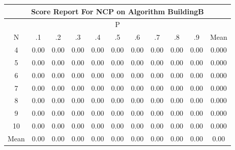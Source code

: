 \documentclass[11pt,a4paper]{report}
\begin{document}
\begin{longtable}{ | c || c | c | c | c | c | c | c | c | c || c |}
\hline
\multicolumn{11}{|c|}{ Score Report For NCP on Algorithm BuildingB} \\
\hline
\multicolumn{11}{|c|}{ P } \\
\hline
N & .1 & .2 & .3 & .4 & .5 & .6 & .7 & .8 & .9 & Mean\\
 \hline
 \hline
 \endhead
  4 &  \cellcolor[HTML]{FFFFFF} 0.00 &  \cellcolor[HTML]{FFFFFF} 0.00 &  \cellcolor[HTML]{FFFFFF} 0.00 &  \cellcolor[HTML]{FFFFFF} 0.00 &  \cellcolor[HTML]{FFFFFF} 0.00 &  \cellcolor[HTML]{FFFFFF} 0.00 &  \cellcolor[HTML]{FFFFFF} 0.00 &  \cellcolor[HTML]{FFFFFF} 0.00 &  \cellcolor[HTML]{FFFFFF} 0.00 & 0.000 \\
  5 &  \cellcolor[HTML]{FFFFFF} 0.00 &  \cellcolor[HTML]{FFFFFF} 0.00 &  \cellcolor[HTML]{FFFFFF} 0.00 &  \cellcolor[HTML]{FFFFFF} 0.00 &  \cellcolor[HTML]{FFFFFF} 0.00 &  \cellcolor[HTML]{FFFFFF} 0.00 &  \cellcolor[HTML]{FFFFFF} 0.00 &  \cellcolor[HTML]{FFFFFF} 0.00 &  \cellcolor[HTML]{FFFFFF} 0.00 & 0.000 \\
  6 &  \cellcolor[HTML]{FFFFFF} 0.00 &  \cellcolor[HTML]{FFFFFF} 0.00 &  \cellcolor[HTML]{FFFFFF} 0.00 &  \cellcolor[HTML]{FFFFFF} 0.00 &  \cellcolor[HTML]{FFFFFF} 0.00 &  \cellcolor[HTML]{FFFFFF} 0.00 &  \cellcolor[HTML]{FFFFFF} 0.00 &  \cellcolor[HTML]{FFFFFF} 0.00 &  \cellcolor[HTML]{FFFFFF} 0.00 & 0.000 \\
  7 &  \cellcolor[HTML]{FFFFFF} 0.00 &  \cellcolor[HTML]{FFFFFF} 0.00 &  \cellcolor[HTML]{FFFFFF} 0.00 &  \cellcolor[HTML]{FFFFFF} 0.00 &  \cellcolor[HTML]{FFFFFF} 0.00 &  \cellcolor[HTML]{FFFFFF} 0.00 &  \cellcolor[HTML]{FFFFFF} 0.00 &  \cellcolor[HTML]{FFFFFF} 0.00 &  \cellcolor[HTML]{FFFFFF} 0.00 & 0.000 \\
  8 &  \cellcolor[HTML]{FFFFFF} 0.00 &  \cellcolor[HTML]{FFFFFF} 0.00 &  \cellcolor[HTML]{FFFFFF} 0.00 &  \cellcolor[HTML]{FFFFFF} 0.00 &  \cellcolor[HTML]{FFFFFF} 0.00 &  \cellcolor[HTML]{FFFFFF} 0.00 &  \cellcolor[HTML]{FFFFFF} 0.00 &  \cellcolor[HTML]{FFFFFF} 0.00 &  \cellcolor[HTML]{FFFFFF} 0.00 & 0.000 \\
  9 &  \cellcolor[HTML]{FFFFFF} 0.00 &  \cellcolor[HTML]{FFFFFF} 0.00 &  \cellcolor[HTML]{FFFFFF} 0.00 &  \cellcolor[HTML]{FFFFFF} 0.00 &  \cellcolor[HTML]{FFFFFF} 0.00 &  \cellcolor[HTML]{FFFFFF} 0.00 &  \cellcolor[HTML]{FFFFFF} 0.00 &  \cellcolor[HTML]{FFFFFF} 0.00 &  \cellcolor[HTML]{FFFFFF} 0.00 & 0.000 \\
  10 &  \cellcolor[HTML]{FFFFFF} 0.00 &  \cellcolor[HTML]{FFFFFF} 0.00 &  \cellcolor[HTML]{FFFFFF} 0.00 &  \cellcolor[HTML]{FFFFFF} 0.00 &  \cellcolor[HTML]{FFFFFF} 0.00 &  \cellcolor[HTML]{FFFFFF} 0.00 &  \cellcolor[HTML]{FFFFFF} 0.00 &  \cellcolor[HTML]{FFFFFF} 0.00 &  \cellcolor[HTML]{FFFFFF} 0.00 & 0.000 \\
 \hline
 \hline
Mean &  \cellcolor[HTML]{FFFFFF} 0.00 &  \cellcolor[HTML]{FFFFFF} 0.00 &  \cellcolor[HTML]{FFFFFF} 0.00 &  \cellcolor[HTML]{FFFFFF} 0.00 &  \cellcolor[HTML]{FFFFFF} 0.00 &  \cellcolor[HTML]{FFFFFF} 0.00 &  \cellcolor[HTML]{FFFFFF} 0.00 &  \cellcolor[HTML]{FFFFFF} 0.00 &  \cellcolor[HTML]{FFFFFF} 0.00 &  \cellcolor[HTML]{FFFFFF} 0.00
\end{longtable}
\end{document}
